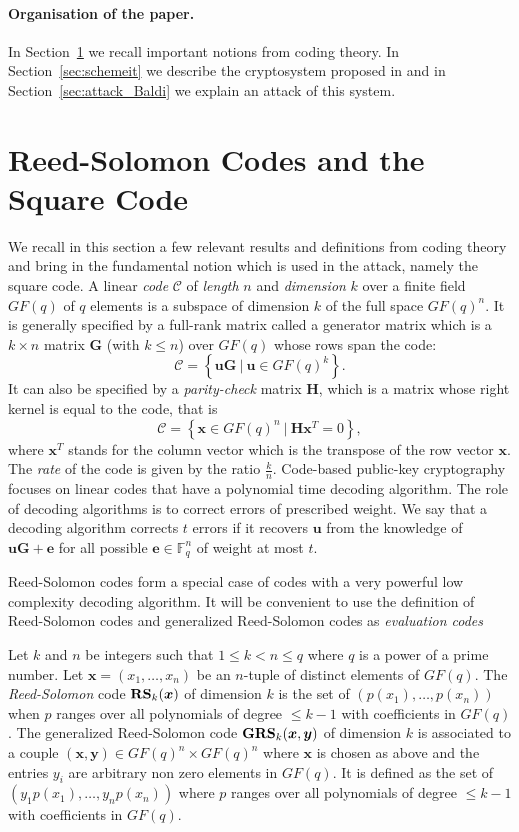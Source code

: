 \documentclass[runningheads,11pt]{llncs}
\newcommand{\F}{\ensuremath{\mathbb{F}}}
\newcommand{\code}[1]{\ensuremath{\mathscr{#1}}}
\newcommand{\word}[1]{\ensuremath{\boldsymbol{#1}}}
\newcommand{\ev}{\word{e}}
\newcommand{\uv}{\word{u}}
\newcommand{\xv}{\word{x}}
\newcommand{\yv}{\word{y}}
\newcommand{\mat}[1]{\ensuremath{\boldsymbol{#1}}}
\newcommand{\Gp}{\mat{G}}
\newcommand{\Hm}{\mat{H}}
\newcommand{\fq}{GF(q)}
\newcommand{\GRS}[3]{\text{\bf GRS}_{#1}(#2,#3)}
\newcommand{\RS}[2]{\text{\bf RS}_{#1}(#2)}
\begin{document}
\medskip

\paragraph{\bf Organisation of the paper.} In Section~\ref{sec:basics} we recall important notions from coding theory. 
In Section~\ref{sec:schemeit} we describe 
the cryptosystem proposed in \cite{BBCRS11a} and in
Section~\ref{sec:attack_Baldi}  we explain an attack of this system.
 
\section{Reed-Solomon Codes and the Square Code}
\label{sec:basics}
We recall in this section a few relevant results and definitions from coding theory and bring in the
fundamental notion which is used in the attack, namely the square code.
A linear \emph{code} $\code{C}$ of {\em length} $n$ and {\em dimension} $k$ over a finite field $\fq$ of $q$ elements is a subspace of dimension $k$ of the full
space $\fq^n$. 
 It is generally specified by a 
full-rank matrix called a generator matrix which is a $k\times n$ matrix $\Gp$ (with $k \leq n$) over $\fq$ whose
rows span the code:
 $$\code{C} = \left\{\uv \Gp ~|~ \uv \in \fq^k \right\}.$$
 It can also be specified by a {\em parity-check} matrix $\Hm$, which is a matrix whose right kernel is equal to 
 the code, that is
 $$
 \code{C} =  \left\{\xv \in \fq^n ~|~ \Hm \xv^T=0 \right\},
 $$
 where $\xv^T$ stands for the column vector which is the transpose of the row vector $\xv$.
 The {\em rate} of the code is 
given by the ratio $\frac{k}{n}$.
Code-based public-key cryptography focuses on linear codes that have a polynomial time decoding algorithm. The role of decoding 
algorithms is to correct  errors of prescribed weight. We say that a decoding algorithm
corrects $t$ errors if it recovers $\uv$ from the
knowledge of $\uv\Gp + \ev$ for all possible
$\ev \in \F_q^n$ of weight at most $t$. 


Reed-Solomon codes form a special case of codes with a very powerful low complexity decoding algorithm.
It will be convenient to use the definition of Reed-Solomon codes and generalized Reed-Solomon codes as
{\em evaluation codes} 
\begin{definition} \label{defGRS}
Let $k$ and $n$ be integers such that $1 \leqslant k < n \leqslant q$ where $q$ is a power of
a prime number.
Let $\xv = (x_1,\dots{},x_n)$ be an $n$-tuple of distinct elements of
$\fq$. 
The \emph{Reed-Solomon} code  $\RS{k}{\xv}$ of dimension $k$ is the set of 
$(p(x_1),\dots{},p(x_n))$
when $p$ ranges over all polynomials of degree $\leqslant k-1$
with coefficients in $\fq$.
The generalized Reed-Solomon code $\GRS{k}{\xv}{\yv}$ of dimension $k$ is associated to a couple 
$(\xv,\yv) \in \fq^n \times \fq^n$ where $\xv$ is chosen as above and
the entries $y_i$ are arbitrary non zero elements in $\fq$. 
It is defined as the set of  $(y_1p(x_1),\dots{},y_np(x_n))$
where $p$ ranges over all polynomials of degree $\leqslant k-1$
with coefficients in $\fq$.
\end{definition}
\end{document}
